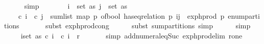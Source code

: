 \begin{isabellebody}
\ \ \ \ \isamarkupfalse%
\ simp\isanewline
\ \ \isamarkupfalse%
\ \isamarkupfalse%
\ {\isachardoublequoteopen}{\isachardot}{\kern0pt}{\isachardot}{\kern0pt}{\isachardot}{\kern0pt}\ {\isacharequal}{\kern0pt}\ {\isacharparenleft}{\kern0pt}{\isasymSum}i\ {\isasymin}\ set\ as{\isachardot}{\kern0pt}\ {\isacharparenleft}{\kern0pt}{\isasymSum}j\ {\isasymin}\ set\ as{\isachardot}{\kern0pt}\ \ \isanewline
\ \ \ \ c\ i\ {\isacharasterisk}{\kern0pt}\ c\ j\ {\isacharasterisk}{\kern0pt}\ {\isacharparenleft}{\kern0pt}sum{\isacharunderscore}{\kern0pt}list\ {\isacharparenleft}{\kern0pt}map\ {\isacharparenleft}{\kern0pt}{\isasymlambda}p{\isachardot}{\kern0pt}\ of{\isacharunderscore}{\kern0pt}bool\ {\isacharparenleft}{\kern0pt}has{\isacharunderscore}{\kern0pt}eq{\isacharunderscore}{\kern0pt}relation\ p\ {\isacharbrackleft}{\kern0pt}i{\isacharcomma}{\kern0pt}j{\isacharbrackright}{\kern0pt}{\isacharparenright}{\kern0pt}\ {\isacharasterisk}{\kern0pt}\ exp{\isacharunderscore}{\kern0pt}h{\isacharunderscore}{\kern0pt}prod\ p{\isacharparenright}{\kern0pt}\ {\isacharparenleft}{\kern0pt}enum{\isacharunderscore}{\kern0pt}partitions\ {}{\isacharparenright}{\kern0pt}{\isacharparenright}{\kern0pt}{\isacharparenright}{\kern0pt}{\isacharparenright}{\kern0pt}{\isacharparenright}{\kern0pt}{\isachardoublequoteclose}\isanewline
\ \ \ \ \isamarkupfalse%
\ {\isacharparenleft}{\kern0pt}subst\ exp{\isacharunderscore}{\kern0pt}h{\isacharunderscore}{\kern0pt}prod{\isacharunderscore}{\kern0pt}cong{\isacharparenright}{\kern0pt}\isanewline
\ \ \ \ \isamarkupfalse%
\ {\isacharparenleft}{\kern0pt}subst\ sum{\isacharunderscore}{\kern0pt}partitions{\isacharprime}{\kern0pt}{\isacharcomma}{\kern0pt}\ simp{\isacharparenright}{\kern0pt}\isanewline
\ \ \ \ \isamarkupfalse%
\ simp\isanewline
\ \ \isamarkupfalse%
\ \isamarkupfalse%
\ {\isachardoublequoteopen}{\isachardot}{\kern0pt}{\isachardot}{\kern0pt}{\isachardot}{\kern0pt}\ {\isacharequal}{\kern0pt}\ {\isacharparenleft}{\kern0pt}{\isasymSum}i{\isasymin}set\ as{\isachardot}{\kern0pt}\ c\ i\ {\isacharasterisk}{\kern0pt}\ c\ i\ {\isacharasterisk}{\kern0pt}\ r\ {}{\isacharparenright}{\kern0pt}{\isachardoublequoteclose}\isanewline
\ \ \ \ \isamarkupfalse%
\ {\isacharparenleft}{\kern0pt}simp\ add{\isacharcolon}{\kern0pt}numeral{\isacharunderscore}{\kern0pt}eq{\isacharunderscore}{\kern0pt}Suc\ exp{\isacharunderscore}{\kern0pt}h{\isacharunderscore}{\kern0pt}prod{\isacharunderscore}{\kern0pt}elim\ r{\isacharunderscore}{\kern0pt}one{\isacharparenright}{\kern0pt}\ \isanewline

\end{isabellebody}
